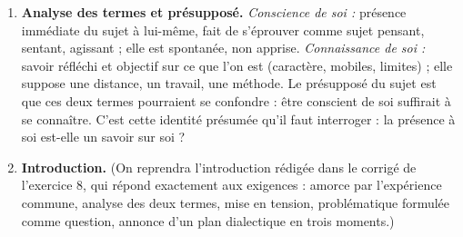 \documentclass[11pt]{article}
\begin{document}
\begin{corrige}
\begin{enumerate}
\item \textbf{Analyse des termes et présupposé.} \emph{Conscience de soi :} présence immédiate du sujet à lui-même, fait de s'éprouver comme sujet pensant, sentant, agissant ; elle est spontanée, non apprise. \emph{Connaissance de soi :} savoir réfléchi et objectif sur ce que l'on est (caractère, mobiles, limites) ; elle suppose une distance, un travail, une méthode. Le présupposé du sujet est que ces deux termes pourraient se confondre : être conscient de soi suffirait à se connaître. C'est cette identité présumée qu'il faut interroger : la présence à soi est-elle un savoir sur soi ?

\item \textbf{Introduction.} (On reprendra l'introduction rédigée dans le corrigé de l'exercice 8, qui répond exactement aux exigences : amorce par l'expérience commune, analyse des deux termes, mise en tension, problématique formulée comme question, annonce d'un plan dialectique en trois moments.)


\end{enumerate}
\end{corrige}
\end{document}
